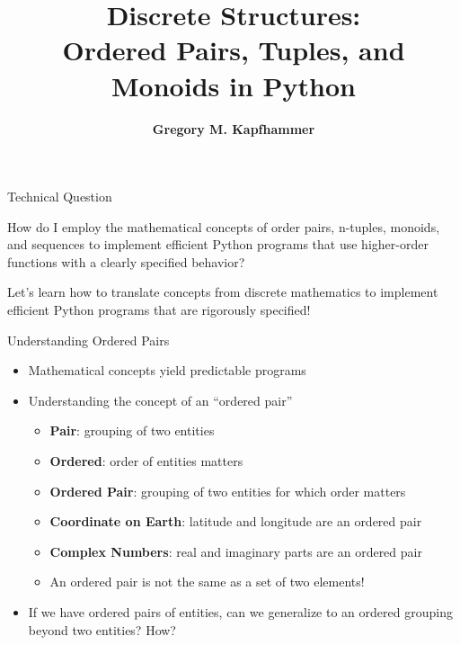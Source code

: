 \documentclass[14pt,aspectratio=169]{beamer}
\title{Discrete Structures: \\ Ordered Pairs, Tuples, and Monoids in Python}
\author{{\bf Gregory M. Kapfhammer}}
\institute[shortinst]{{\bf Department of Computer Science, Allegheny College}}
\begin{document}
{
  \begin{frame}
    \titlepage
  \end{frame}
}

%
\begin{frame}{Technical Question}
  \hspace*{.25in}
  \begin{minipage}{5in}
  \begin{center}
    {\large How do I employ the mathematical concepts of order pairs, n-tuples,
      monoids, and sequences to implement efficient Python programs that use
    higher-order functions with a clearly specified behavior?}
  \end{center}
  \end{minipage}
  \vspace{2ex}
  \begin{center}
    \small Let's learn how to translate concepts from discrete mathematics to
    implement efficient Python programs that are rigorously specified!
  \end{center}
\end{frame}

%
\begin{frame}{Understanding Ordered Pairs}
  \begin{itemize}
    \item Mathematical concepts yield predictable programs
      \vspace*{-.15in}
    \item Understanding the concept of an ``ordered pair''
      \begin{itemize}
        \item {\bf Pair}: grouping of two entities
        \item {\bf Ordered}: order of entities matters
        \item {\bf Ordered Pair}: grouping of two entities for which order
          matters
        \item {\bf Coordinate on Earth}: latitude and longitude are an ordered
          pair
        \item {\bf Complex Numbers}: real and imaginary parts are an ordered
          pair
        \item An ordered pair is not the same as a set of two elements!
      \end{itemize}
      \vspace*{-.2in}
    \item If we have ordered pairs of entities, can we generalize to
      an ordered grouping beyond two entities? How?
  \end{itemize}
\end{frame}
\end{document}
